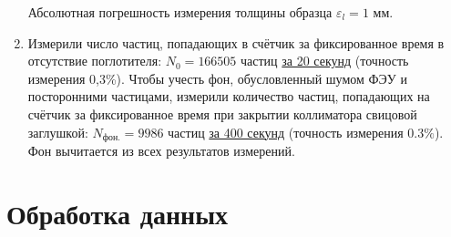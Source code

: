 \documentclass{physlab}
\begin{document}
\begin{enumerate}
	Абсолютная погрешность измерения толщины образца $\varepsilon_l=1$ мм.
    \item Измерили число частиц, попадающих в счётчик за фиксированное время в отсутствие поглотителя: \underline{$N_0=166505$} частиц \underline{за 20 секунд} (точность измерения 0,3\%). Чтобы учесть фон, обусловленный шумом ФЭУ и посторонними частицами, измерили количество частиц, попадающих на счётчик за фиксированное время при закрытии коллиматора свицовой заглушкой: \underline{$N_\text{фон.}=9986$} частиц \underline{за 400 секунд} (точность измерения $0.3\%$).
		Фон вычитается из всех результатов измерений.

\end{enumerate}
	
\section{Обработка данных}
\end{document}
